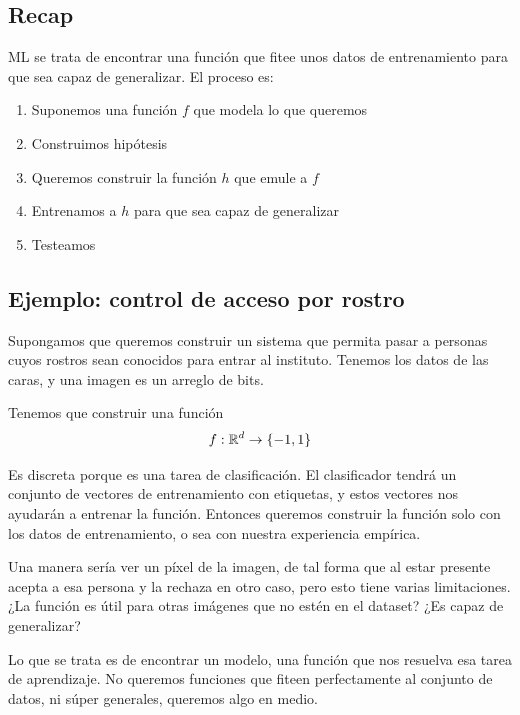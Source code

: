 \documentclass[11pt,letterpaper]{article}
\begin{document}
\subsection*{Recap}

ML se trata de encontrar una función que fitee unos datos de
entrenamiento para que sea capaz de generalizar. El proceso es:

\begin{enumerate}[itemsep=0.1em]
    \item Suponemos una función $f$ que modela lo que queremos
    \item Construimos hipótesis
    \item Queremos construir la función $h$ que emule a $f$
    \item Entrenamos a $h$ para que sea capaz de generalizar
    \item Testeamos
\end{enumerate}


\subsection*{Ejemplo: control de acceso por rostro}

Supongamos que queremos construir un sistema que permita pasar a
personas cuyos rostros sean conocidos para entrar al instituto.
Tenemos los datos de las caras, y una imagen es un arreglo de bits.

Tenemos que construir una función
\[
    f: \mathbb{R}^d \to \left\{ -1, 1 \right\}
\]

Es discreta porque es una tarea de clasificación. El clasificador
tendrá un conjunto de vectores de entrenamiento con etiquetas, y estos
vectores nos ayudarán a entrenar la función. Entonces queremos
construir la función solo con los datos de entrenamiento, o sea con
nuestra experiencia empírica.

Una manera sería ver un píxel de la imagen, de tal forma que al estar
presente acepta a esa persona y la rechaza en otro caso, pero esto
tiene varias limitaciones. ¿La función es útil para otras imágenes que
no estén en el dataset? ¿Es capaz de generalizar?

\begin{idea}
  Lo que se trata es de encontrar un modelo, una función que nos
  resuelva esa tarea de aprendizaje. No queremos funciones que fiteen
  perfectamente al conjunto de datos, ni súper generales, queremos
  algo en medio.
\end{idea}
\end{document}
